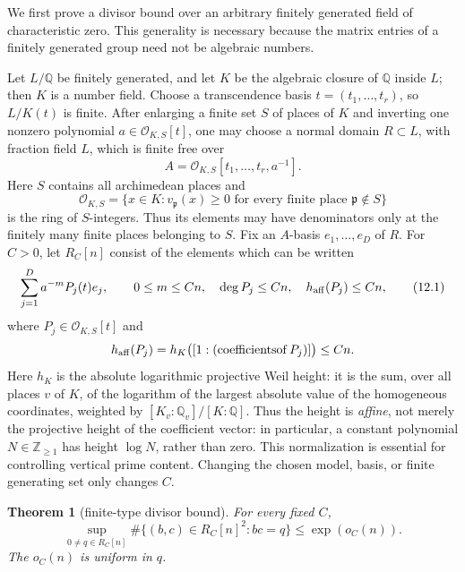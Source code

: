 \documentclass[11pt,reqno]{amsart}
\newtheorem{theorem}{Theorem}[section]
\theoremstyle{definition}
\theoremstyle{remark}
\newcommand{\Q}{\mathbb Q}
\newcommand{\Z}{\mathbb Z}
\newcommand{\cO}{\mathcal O}
\begin{document}
We first prove a divisor bound over an arbitrary finitely generated field of
characteristic zero.  This generality is necessary because the matrix
entries of a finitely generated group need not be algebraic numbers.

Let \(L/\Q\) be finitely generated, and let \(K\) be the algebraic closure of
\(\Q\) inside \(L\); then \(K\) is a number field.  Choose a transcendence
basis \(t=(t_1,\ldots,t_r)\), so \(L/K(t)\) is finite.  After enlarging a
finite set \(S\) of places of \(K\) and inverting one nonzero polynomial
\(a\in\cO_{K,S}[t]\), one may choose a normal domain \(R\subset L\), with
fraction field \(L\), which is finite free over
\[
 A=\cO_{K,S}[t_1,\ldots,t_r,a^{-1}].
\]
Here \(S\) contains all archimedean places and
\[
 \cO_{K,S}=\{x\in K:v_{\mathfrak p}(x)\ge0
       \text{ for every finite place }\mathfrak p\notin S\}
\]
is the ring of \(S\)-integers.  Thus its elements may have denominators only
at the finitely many finite places belonging to \(S\).
Fix an \(A\)-basis \(e_1,\ldots,e_D\) of \(R\).  For \(C>0\), let
\(R_C[n]\) consist of the elements which can be written
\[
 \sum_{j=1}^D a^{-m}P_j(t)e_j,
 \qquad
 0\le m\le Cn,\quad
 \deg P_j\le Cn,\quad h_{\rm aff}(P_j)\le Cn,
\tag{12.1}
\]
where \(P_j\in\cO_{K,S}[t]\) and
\[
 h_{\rm aff}(P_j)=h_K\bigl([1:(\operatorname{coefficients of }P_j)]\bigr)
 \le Cn.
\]
Here \(h_K\) is the absolute logarithmic projective Weil height: it is the
sum, over all places \(v\) of \(K\), of the logarithm of the largest absolute
value of the homogeneous coordinates, weighted by
\([K_v:\Q_v]/[K:\Q]\).
Thus the height is \emph{affine}, not merely the projective height of the
coefficient vector: in particular, a constant polynomial \(N\in\Z_{\ge1}\) has
height \(\log N\), rather than zero.  This normalization is essential for
controlling vertical prime content.  Changing the chosen model, basis, or
finite generating set only changes \(C\).

\begin{theorem}[finite-type divisor bound]\label{thm:finite-type-divisor}
For every fixed \(C\),
\[
 \sup_{0\ne q\in R_C[n]}
 \#\{(b,c)\in R_C[n]^2:bc=q\}\le\exp(o_C(n)).
\tag{12.2}
\]
The \(o_C(n)\) is uniform in \(q\).
\end{theorem}
\end{document}
